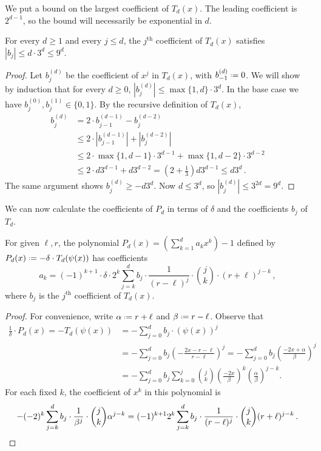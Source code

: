 \documentclass{theoretics}
\newcommand*{\define}{\mathrel{\vcenter{\baselineskip0.5ex \lineskiplimit0pt
                      \hbox{\scriptsize.}\hbox{\scriptsize.}}}%
                      =}
\newcommand{\zo}{\{0,1\}}
\begin{document}
We put a bound on the largest coefficient of $T_d(x)$. The leading coefficient is $2^{d-1}$, so the
bound will necessarily be exponential in $d$.

\begin{proposition}
\label{res:cheb_coefficient_ub}
For every $d \geq 1$ and every $j \leq d$, the $j^\text{th}$ coefficient of $T_d(x)$
satisfies $|b_j| \leq d \cdot 3^d \leq 9^d$.
\end{proposition}
\begin{proof}
Let $b^{(d)}_j$ be the coefficient of $x^j$ in $T_d(x)$, with $b^{(d)}_{-1} \define 0$. We will
show by induction that for every $d \ge 0$, $|b^{(d)}_j| \leq \max\{1,d\} \cdot 3^d$. In the base
case we have $b^{(0)}_j, b^{(1)}_j \in \zo$. By the recursive definition of $T_d(x)$,
\begin{align*}
  b^{(d)}_j &= 2 \cdot b^{(d-1)}_{j-1} - b^{(d-2)}_j \\
            &\leq 2 \cdot |b^{(d-1)}_{j-1}| + |b^{(d-2)}_j| \\
            &\leq 2 \cdot \max\{1,d-1\} \cdot 3^{d-1} + \max\{1,d-2\} \cdot 3^{d-2} \\
            &\leq 2 \cdot d 3^{d-1} + d 3^{d-2}
            = \left(2 + \frac{1}{3}\right) d 3^{d-1} \leq d 3^d \,.
\end{align*}
The same argument shows $b^{(d)}_j \geq - d 3^d$. Now $d \le 3^d$, so $|b^{(d)}_j| \leq 3^{2d} =
9^d$.
\end{proof}

We can now calculate the coefficients of $P_d$ in terms of $\delta$ and the coefficients $b_j$ of
$T_d$.

\begin{proposition}[Coefficients of $P_d$]
\label{res:coefficients_P}
For given $\ell, r$, the polynomial $P_d(x) = \left(\sum_{k=1}^d a_k x^k\right) - 1$ defined by
$P_d(x) \define -\delta \cdot T_d(\psi(x))$ has coefficients
\[
    a_k = (-1)^{k+1} \cdot 
    \delta \cdot 2^k \sum_{j=k}^d b_j \cdot \frac{1}{(r-\ell)^j} \cdot \binom{j}{k}
\cdot (r+\ell)^{j-k} \,,
\]
where $b_j$ is the $j^\text{th}$ coefficient of $T_d(x)$.
\end{proposition}
\begin{proof}
For convenience, write $\alpha \define r+\ell$ and $\beta \define r - \ell$.
Observe that
\begin{align*}
\frac{1}{\delta} \cdot P_d(x)
  = -T_d(\psi(x)) 
  &= -\sum_{j=0}^d b_j \cdot (\psi(x))^j \\
  &= -\sum_{j=0}^d b_j \left(-\frac{2x - r - \ell}{r - \ell}\right)^j 
   = -\sum_{j=0}^d b_j \left(\frac{-2x + \alpha}{\beta}\right)^j  \\
  &= -\sum_{j=0}^d b_j \sum_{k=0}^j \binom{j}{k}
        \left(\frac{-2x}{\beta}\right)^k \left(\frac{\alpha}{\beta}\right)^{j-k}.
\end{align*}
For each fixed $k$, the coefficient of $x^k$ in this polynomial is
\[
  -(-2)^k \sum_{j=k}^d b_j \cdot \frac{1}{\beta^j} \cdot \binom{j}{k} \alpha^{j-k} 
  = (-1)^{k+1} 2^k \sum_{j=k}^d b_j \cdot \frac{1}{(r-\ell)^j} \cdot \binom{j}{k} (r+\ell)^{j-k} \,.
  \qedhere
\]
\end{proof}
\end{document}
